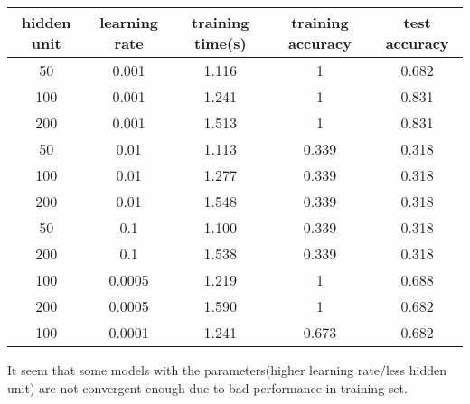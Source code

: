 \documentclass{article}
\begin{document}
\begin{center}
\begin{tabular}{|c|c|c|c|c|}
\hline
hidden unit & learning rate & training time(s) & training accuracy & test accuracy\\
\hline
50 & 0.001 & 1.116 & 1 &  0.682 \\
\hline
100 & 0.001 & 1.241 & 1 &  0.831 \\
\hline
200 & 0.001 & 1.513 & 1 &  0.831 \\
\hline
50 & 0.01 & 1.113 & 0.339 &  0.318 \\
\hline
100 & 0.01 & 1.277 & 0.339 &  0.318 \\
\hline
200 & 0.01 & 1.548 & 0.339 &  0.318 \\
\hline
50 & 0.1 & 1.100 & 0.339 &  0.318 \\
\hline
200 & 0.1 & 1.538 & 0.339 &  0.318 \\
\hline
100 & 0.0005 & 1.219 & 1 &  0.688 \\
\hline
200 & 0.0005 & 1.590 & 1 &  0.682 \\
\hline
100 & 0.0001 & 1.241 & 0.673 &  0.682 \\
\hline
\end{tabular}
\end{center}

It seem that some models with the parameters(higher learning rate/less hidden unit) are not convergent enough due to bad performance in training set. 
\end{document}
